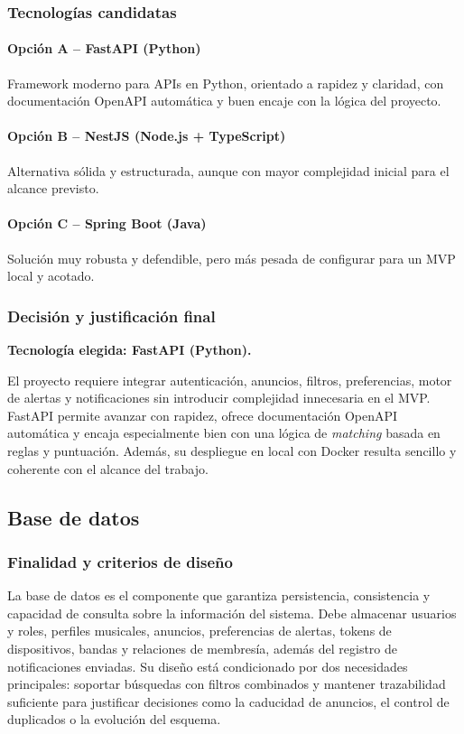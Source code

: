 \documentclass[12pt,a4paper]{report}
\begin{document}
\subsubsection{Tecnologías candidatas}

\paragraph{Opción A -- FastAPI (Python)}
Framework moderno para APIs en Python, orientado a rapidez y claridad, con documentación OpenAPI automática y buen encaje con la lógica del proyecto.

\paragraph{Opción B -- NestJS (Node.js + TypeScript)}
Alternativa sólida y estructurada, aunque con mayor complejidad inicial para el alcance previsto.

\paragraph{Opción C -- Spring Boot (Java)}
Solución muy robusta y defendible, pero más pesada de configurar para un MVP local y acotado.

\subsubsection{Decisión y justificación final}
\textbf{Tecnología elegida: FastAPI (Python).}

El proyecto requiere integrar autenticación, anuncios, filtros, preferencias, motor de alertas y notificaciones sin introducir complejidad innecesaria en el MVP. FastAPI permite avanzar con rapidez, ofrece documentación OpenAPI automática y encaja especialmente bien con una lógica de \textit{matching} basada en reglas y puntuación. Además, su despliegue en local con Docker resulta sencillo y coherente con el alcance del trabajo.

\subsection{Base de datos}

\subsubsection{Finalidad y criterios de diseño}
La base de datos es el componente que garantiza persistencia, consistencia y capacidad de consulta sobre la información del sistema. Debe almacenar usuarios y roles, perfiles musicales, anuncios, preferencias de alertas, tokens de dispositivos, bandas y relaciones de membresía, además del registro de notificaciones enviadas. Su diseño está condicionado por dos necesidades principales: soportar búsquedas con filtros combinados y mantener trazabilidad suficiente para justificar decisiones como la caducidad de anuncios, el control de duplicados o la evolución del esquema.
\end{document}
